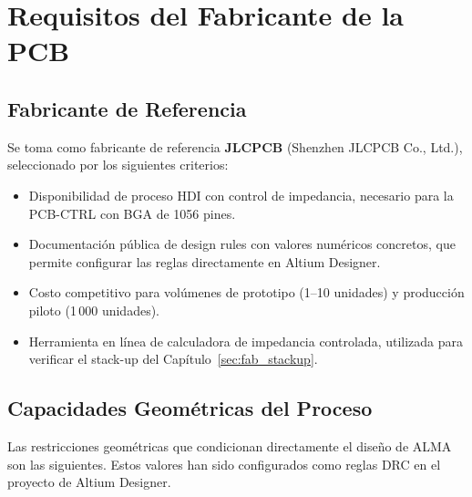 \chapter{Requisitos del Fabricante de la PCB}
\label{chap:fabricante}

\section{Fabricante de Referencia}
\label{sec:fab_fabricante}

Se toma como fabricante de referencia \textbf{JLCPCB} (Shenzhen JLCPCB Co.,
Ltd.), seleccionado por los siguientes criterios:

\begin{itemize}
  \item Disponibilidad de proceso HDI con control de impedancia, necesario para
    la PCB-CTRL con BGA de 1056 pines.
  \item Documentación pública de design rules con valores numéricos concretos,
    que permite configurar las reglas directamente en Altium Designer.
  \item Costo competitivo para volúmenes de prototipo (1--10 unidades) y producción
    piloto (1\,000 unidades).
  \item Herramienta en línea de calculadora de impedancia controlada, utilizada
    para verificar el stack-up del Capítulo~\ref{sec:fab_stackup}.
\end{itemize}

\section{Capacidades Geométricas del Proceso}
\label{sec:fab_geometria}

Las restricciones geométricas que condicionan directamente el diseño de ALMA
son las siguientes. Estos valores han sido configurados como reglas DRC en el
proyecto de Altium Designer.

